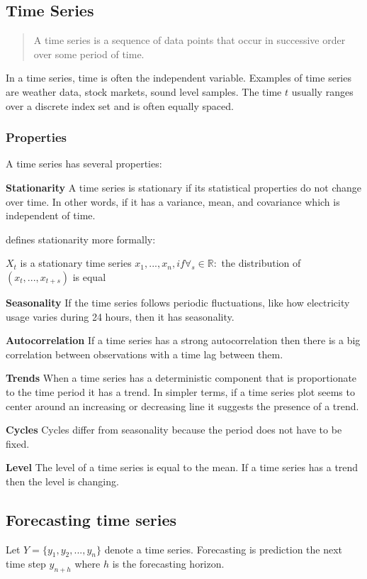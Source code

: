\subsection{Time Series}
\label{sec:time-series}
\begin{quote}
    A time series is a sequence of data
    points that occur in successive order over some period of time.
\end{quote}
\cite{Hayes}

In a time series, time is often the independent variable.
Examples of time series are weather data, stock markets, sound level samples.
The time $t$ usually ranges over a discrete index set and is often equally spaced.

\subsubsection{Properties}
A time series has several properties:

\textbf{Stationarity}
A time series is stationary if its statistical properties do not change over time.
In other words, if it has a variance, mean, and covariance which is independent of time.

\cite{RobJHyndman2014} defines stationarity more formally:
\begin{definition}
   $X_t$ is a stationary time series 
   $x_1, ..., x_n, if \forall_s \in \mathbb{R} :$
   the distribution of $(x_t, ..., x_{t+s})$ is equal
\end{definition}

\textbf{Seasonality}
If the time series follows periodic fluctuations, like how electricity usage varies during 24 hours,
then it has seasonality.

\textbf{Autocorrelation}
If a time series has a strong autocorrelation then there is a big
correlation between observations with a time lag between them.

\textbf{Trends}
When a time series has a deterministic component that is proportionate to the time period it has a trend.
In simpler terms, if a time series plot seems to center around an increasing or decreasing line it suggests the presence of a trend.

\textbf{Cycles}
Cycles differ from seasonality because the period does not have to be fixed.


\textbf{Level}
The level of a time series is equal to the mean. If a time series has a trend
then the level is changing.


\subsection{Forecasting time series}
Let  $Y = \{y_1, y_2, ..., y_n\}$ denote a time series.
Forecasting is prediction the next time step $y_{n+h}$ where $h$ is the forecasting horizon.

